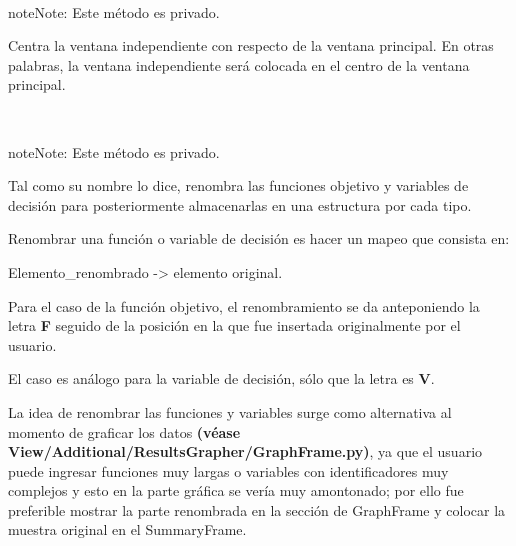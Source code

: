 \documentclass[letterpaper,10pt,english]{sphinxmanual}
\begin{document}
\begin{fulllineitems}
\begin{fulllineitems}
\label{View/Additional/ResultsGrapher/ResultsGrapherToplevel:View.Additional.ResultsGrapher.ResultsGrapherToplevel.ResultsGrapherToplevel._ResultsGrapherToplevel__center}~
\begin{notice}{note}{Note:}
Este método es privado.
\end{notice}

Centra la ventana independiente con respecto de la ventana principal.
En otras palabras, la ventana independiente será colocada en el centro de la 
ventana principal.

\end{fulllineitems}


\begin{fulllineitems}
\label{View/Additional/ResultsGrapher/ResultsGrapherToplevel:View.Additional.ResultsGrapher.ResultsGrapherToplevel.ResultsGrapherToplevel._ResultsGrapherToplevel__create_renamed_settings}~
\begin{notice}{note}{Note:}
Este método es privado.
\end{notice}

\begin{DUlineblock}{0em}
\item[] Tal como su nombre lo dice, renombra las funciones objetivo y variables de decisión
para posteriormente almacenarlas en una estructura por cada tipo.
\item[] Renombrar una función o variable de decisión es hacer un mapeo que consista en:
\item[] Elemento\_renombrado -\textgreater{} elemento original.
\item[] Para el caso de la función objetivo, el renombramiento se da anteponiendo la letra \textbf{F}
seguido de la posición en la que fue insertada originalmente por el usuario.
\item[] El caso es análogo para la variable de decisión, sólo que la letra es \textbf{V}.
\item[] La idea de renombrar las funciones y variables surge como alternativa al momento de graficar los datos
\textbf{(véase View/Additional/ResultsGrapher/GraphFrame.py)}, ya que el usuario puede ingresar
funciones muy largas o variables con identificadores muy complejos y esto en la parte gráfica 
se vería muy amontonado; por ello fue preferible mostrar la parte renombrada en la sección de 
GraphFrame y colocar la muestra original en el SummaryFrame.         
\end{DUlineblock}

\end{fulllineitems}


\end{fulllineitems}
\end{document}
